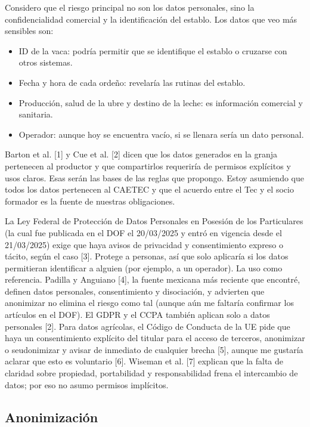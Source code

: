 Considero que el riesgo principal no son los datos personales, sino la confidencialidad comercial y la identificación del establo. Los datos que veo más sensibles son:

\begin{itemize}
  \item ID de la vaca: podría permitir que se identifique el establo o cruzarse con otros sistemas.
  \item Fecha y hora de cada ordeño: revelaría las rutinas del establo.
  \item Producción, salud de la ubre y destino de la leche: es información comercial y sanitaria.
  \item Operador: aunque hoy se encuentra vacío, si se llenara sería un dato personal.
\end{itemize}

Barton et al. [1] y Cue et al. [2] dicen que los datos generados en la granja pertenecen al productor y que compartirlos requeriría de permisos explícitos y usos claros. Esas serán las bases de las reglas que propongo. Estoy asumiendo que todos los datos pertenecen al CAETEC y que el acuerdo entre el Tec y el socio formador es la fuente de nuestras obligaciones.

La Ley Federal de Protección de Datos Personales en Posesión de los Particulares (la cual fue publicada en el DOF el 20/03/2025 y entró en vigencia desde el 21/03/2025) exige que haya avisos de privacidad y consentimiento expreso o tácito, según el caso [3]. Protege a personas, así que solo aplicaría si los datos permitieran identificar a alguien (por ejemplo, a un operador). La uso como referencia. Padilla y Anguiano [4], la fuente mexicana más reciente que encontré, definen datos personales, consentimiento y disociación, y advierten que anonimizar no elimina el riesgo como tal (aunque aún me faltaría confirmar los artículos en el DOF). El GDPR y el CCPA también aplican solo a datos personales [2]. Para datos agrícolas, el Código de Conducta de la UE pide que haya un consentimiento explícito del titular para el acceso de terceros, anonimizar o seudonimizar y avisar de inmediato de cualquier brecha [5], aunque me gustaría aclarar que esto es voluntario [6]. Wiseman et al. [7] explican que la falta de claridad sobre propiedad, portabilidad y responsabilidad frena el intercambio de datos; por eso no asumo permisos implícitos.

\subsection{Anonimización}

